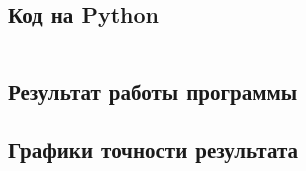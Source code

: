 \documentclass[a4paper,12pt]{article}
\newenvironment{longlisting}{\captionsetup{type=listing}}{}
\begin{document}
\subsection{Код на Python}

\begin{longlisting}
\inputminted{python}{series_fixed_precision.py}
\end{longlisting}

\subsection{Результат работы программы}
\begin{longlisting}

\end{longlisting}

\subsection{Графики точности результата}
\end{document}
